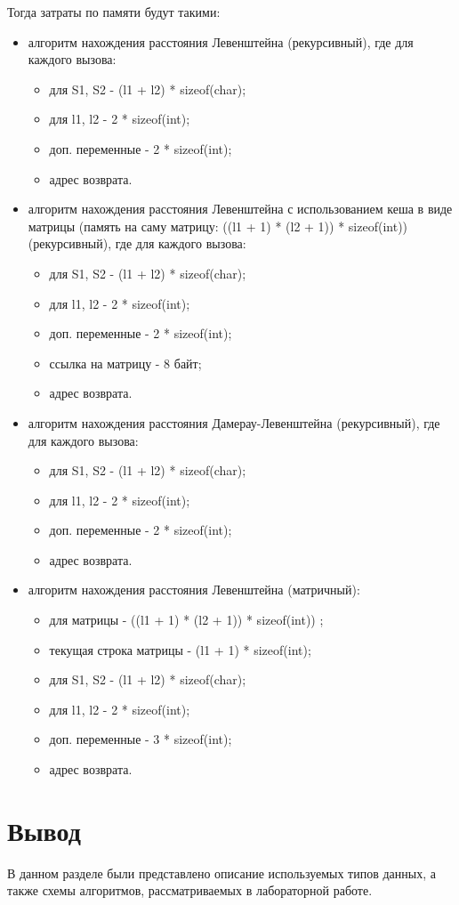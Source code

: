 Тогда затраты по памяти будут такими:
\begin{itemize}
	\item алгоритм нахождения расстояния Левенштейна (рекурсивный), где для каждого вызова:
	
	\begin{itemize}
		\item для S1, S2 - (l1 + l2) * sizeof(char);
		\item для l1, l2 - 2 * sizeof(int);
		\item доп. переменные - 2 * sizeof(int);
		\item адрес возврата.
	\end{itemize}
	
	\item алгоритм нахождения расстояния Левенштейна с использованием кеша в виде матрицы (память на саму матрицу: ((l1 + 1) * (l2 + 1)) * sizeof(int)) (рекурсивный), где для каждого вызова:
	
	\begin{itemize}
		\item для S1, S2 - (l1 + l2) * sizeof(char);
		\item для l1, l2 - 2 * sizeof(int);
		\item доп. переменные - 2 * sizeof(int);
		\item ссылка на матрицу - 8 байт;
		\item адрес возврата.
	\end{itemize}
	
	\item алгоритм нахождения расстояния Дамерау-Левенштейна (рекурсивный), где для каждого вызова:
	
	\begin{itemize}
		\item для S1, S2 - (l1 + l2) * sizeof(char);
		\item для l1, l2 - 2 * sizeof(int);
		\item доп. переменные - 2 * sizeof(int);
		\item адрес возврата.
	\end{itemize}
	
	
	\item алгоритм нахождения расстояния Левенштейна (матричный):
	
	\begin{itemize}
		\item для матрицы - ((l1 + 1) * (l2 + 1)) * sizeof(int)) ;
		\item текущая строка матрицы - (l1 + 1) * sizeof(int);
		\item для S1, S2 - (l1 + l2) * sizeof(char);
		\item для l1, l2 - 2 * sizeof(int);
		\item доп. переменные - 3 * sizeof(int);
		\item адрес возврата.
	\end{itemize}
\end{itemize}

\section{Вывод}
В данном разделе были представлено описание используемых типов данных, а также схемы алгоритмов, рассматриваемых в лабораторной работе.